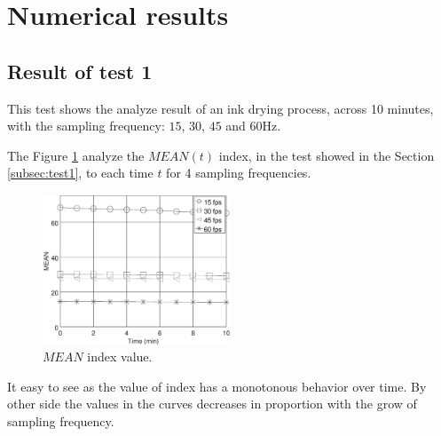\documentclass[review]{elsarticle}
\begin{document}
\section{Numerical results} 
\label{sec:numericalresults}

\subsection{Result of test 1}
\label{subsec:resulttest1}
This test shows the analyze result of an ink drying process, across 10 minutes,
with the sampling frequency: $15$, $30$, $45$ and $60$Hz.

The Figure \ref{fig:MEANtest1} analyze the $MEAN(t)$ index,
in the test showed in the Section \ref{subsec:test1},
to each time $t$ for 4 sampling frequencies.
\begin{figure}[ht!]
    \centering
    \includegraphics[width=0.5\textwidth]{FPS_f11_rawMEAN.eps}
    \caption{$MEAN$ index value.}\label{fig:MEANtest1}
\end{figure}
It easy to see as the value of index has a monotonous 
behavior over time. By other side the values in the curves decreases in proportion with 
the grow of sampling frequency.
\end{document}
